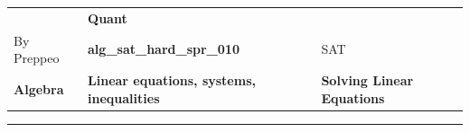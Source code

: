 \documentclass[11pt,paper=a4,answers]{exam}
\begin{document}
\begin{center}
    \centering
    \renewcommand{\arraystretch}{1.5}
    \begin{tabularx}{\textwidth}{YYY}
    & \normalsize\bf{{\Large{{Quant}}}} & \\
    By Preppeo & \normalsize\bf{{alg\_sat\_hard\_spr\_010}} & SAT\\
    \normalsize{{\textbf{{Algebra}} }} & \normalsize{{\textbf{{Linear equations, systems, inequalities }} }} & \normalsize{{\textbf{{Solving Linear Equations}} }} \\
    \end{tabularx}
\end{center}
\par\noindent\rule{\textwidth}{1pt}
\end{document}
